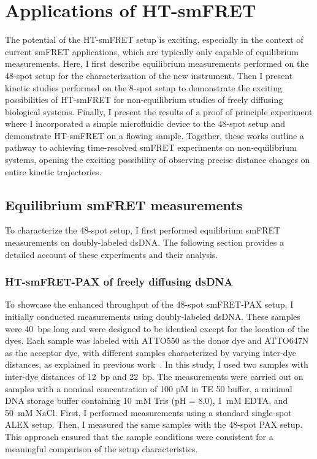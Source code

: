 \chapter{Applications of HT-smFRET}
\label{chpt:HT-smFRET_applications}

The potential of the \ac{HT-smFRET} setup is exciting, especially in the context of current \ac{smFRET} applications, which are typically only capable of equilibrium measurements.
Here, I first describe equilibrium measurements performed on the 48-spot setup for the characterization of the new instrument.
Then I present kinetic studies performed on the 8-spot setup to demonstrate the exciting possibilities of \ac{HT-smFRET} for non-equilibrium studies of freely diffusing biological systems.
Finally, I present the results of a proof of principle experiment where I incorporated a simple microfluidic device to the 48-spot setup and demonstrate \ac{HT-smFRET} on a flowing sample.
Together, these works outline a pathway to achieving time-resolved \ac{smFRET} experiments on non-equilibrium systems, opening the exciting possibility of observing precise distance changes on entire kinetic trajectories.

\section{Equilibrium smFRET measurements}
\label{sec:HT-smFRET_measurements}

To characterize the 48-spot setup, I first performed equilibrium \ac{smFRET} measurements on doubly-labeled \ac{dsDNA}.
The following section provides a detailed account of these experiments and their analysis.

\subsection{HT-smFRET-PAX of freely diffusing dsDNA}
\label{sec:HT-smFRET_measurements_DNA}

To showcase the enhanced throughput of the 48-spot smFRET-PAX setup, I initially conducted measurements using doubly-labeled \ac{dsDNA}. These samples were 40~\ac{bp}s long and were designed to be identical except for the location of the dyes.  
Each sample was labeled with ATTO550 as the donor dye and ATTO647N as the acceptor dye, with different samples characterized by varying inter-dye distances, as explained in previous work~\cite{ingargiola_PLOS1_2016}. 
In this study, I used two samples with inter-dye distances of 12~\ac{bp} and 22~\ac{bp}\cite{ingargiola_JCP_2018}. 
The measurements were carried out on samples with a nominal concentration of 100 pM in TE 50 buffer, a minimal DNA storage buffer containing 10~mM Tris (pH = 8.0), 1~mM EDTA, and 50~mM NaCl. 
First, I performed measurements using a standard single-spot \ac{ALEX} setup. 
Then, I measured the same samples with the 48-spot PAX setup.
This approach ensured that the sample conditions were consistent for a meaningful comparison of the setup characteristics.

